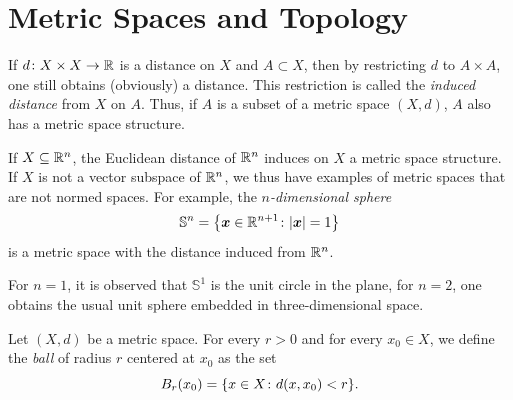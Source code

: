 \section{Metric Spaces and Topology}

\begin{definition}
If $d\colon X\times X \to {\mathbb R}$ is a distance on $X$
and $A \subset X$,
then by restricting $d$ to $A \times A$, one still obtains (obviously) a
distance.
This restriction is called the \emph{induced distance}
%
%
from $X$ on $A$.
Thus, if $A$ is a subset of a metric space $(X,d)$, $A$ also has a metric space
structure.
\end{definition}

\begin{example}[sphere]
If $X\subseteq {\mathbb R}^n$, the Euclidean distance of ${\mathbb R}^n$ induces
on $X$ a metric space structure. If $X$ is not a vector subspace of ${\mathbb R}^n$, we
thus have examples of metric spaces that are not normed spaces. For example,
the \emph{$n$-dimensional sphere}%
%
\[
  \mathbb S^n = {\left\{ \boldsymbol x \in {\mathbb R}^{n+1}\colon {\left|\boldsymbol x\right|} = 1 \right\}}
\]
is a metric space with the distance induced from ${\mathbb R}^n$.

For $n=1$, it is observed that $\mathbb S^1$ is the unit circle in the plane,
for $n=2$, one obtains the usual unit sphere embedded in three-dimensional
space.
\end{example}

\begin{definition}[ball]%
\label{def:palla}%
\mymark{*}%
Let $(X,d)$ be a metric space.
For every $r>0$ and for every $x_0\in X$,
we define the \emph{ball}%
%
 of radius $r$ centered at
$x_0$ as the set
\[
  B_r(x_0) = {\left\{ x\in X \colon d(x,x_0) < r \right\}}.
\]
\end{definition}

